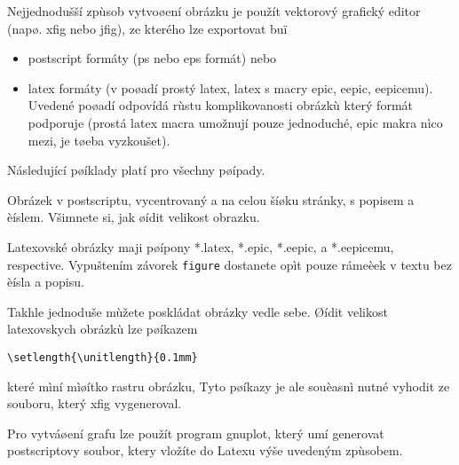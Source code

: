 \documentclass[12pt]{article}
\begin{document}
Nejjednodušší zpùsob vytvoøení obrázku je použít vektorový grafický
editor (napø. xfig nebo jfig), ze kterého lze exportovat buï
\begin{itemize}
\item postscript formáty (ps nebo eps formát) nebo
\item latex formáty (v poøadí prostý latex, latex s macry epic, eepic, eepicemu). Uvedené poøadí odpovídá rùstu
komplikovanosti obrázkù který formát podporuje (prostá latex macra
umožnují pouze jednoduché, epic makra nìco mezi, je tøeba
vyzkoušet).

\end{itemize}
Následující pøíklady platí pro všechny pøípady.

Obrázek v postscriptu, vycentrovaný a na celou šíøku stránky, s
popisem a èíslem. Všimnete si, jak øídit velikost obrazku.


Latexovské obrázky maji pøípony *.latex, *.epic, *.eepic, a
*.eepicemu, respective.
%
Vypuštením závorek {\tt figure} dostanete opìt pouze rámeèek v textu
bez èísla a popisu.

Takhle jednoduše mùžete poskládat obrázky vedle sebe.
Øídit velikost latexovskych obrázkù lze pøíkazem
\begin{verbatim}
\setlength{\unitlength}{0.1mm}
\end{verbatim}
které mìní mìøítko rastru obrázku, Tyto pøíkazy je ale souèasnì
nutné vyhodit ze souboru, který xfig vygeneroval.

Pro vytváøení grafu lze použít program gnuplot, který umí generovat
postscriptovy soubor, ktery vložíte do Latexu výše uvedeným
zpùsobem.
\end{document}
